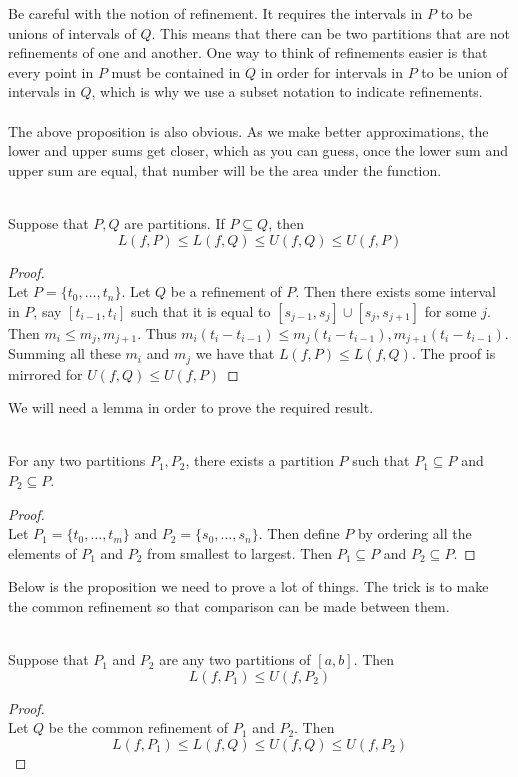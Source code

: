 \documentclass[a4paper]{article}
\begin{document}
Be careful with the notion of refinement. It requires the intervals in $P$ to be unions of intervals of $Q$. This means that there can be two partitions that are not refinements of one and another. One way to think of refinements easier is that every point in $P$ must be contained in $Q$ in order for intervals in $P$ to be union of intervals in $Q$, which is why we use a subset notation to indicate refinements. \\~\\
The above proposition is also obvious. As we make better approximations, the lower and upper sums get closer, which as you can guess, once the lower sum and upper sum are equal, that number will be the area under the function. 

\begin{prp}{}{}\\ Suppose that $P,Q$ are partitions. If $P\subseteq Q$, then $$L(f,P)\leq L(f,Q)\leq U(f,Q)\leq U(f,P)$$ 
\begin{proof}\\ Let $P=\{t_0,\dots,t_n\}$. Let $Q$ be a refinement of $P$. Then there exists some interval in $P$, say $[t_{i-1},t_i]$ such that it is equal to $[s_{j-1},s_j]\cup[s_j,s_{j+1}]$ for some $j$. Then $m_i\leq m_j,m_{j+1}$. Thus $m_i(t_i-t_{i-1})\leq m_j(t_i-t_{i-1}),m_{j+1}(t_i-t_{i-1})$. Summing all these $m_i$ and $m_j$ we have that $L(f,P)\leq L(f,Q)$. The proof is mirrored for $U(f,Q)\leq U(f,P)$
\end{proof}
\end{prp}

We will need a lemma in order to prove the required result. 

\begin{lmm}{}{}\\ For any two partitions $P_1,P_2$, there exists a partition $P$ such that $P_1\subseteq P$ and $P_2\subseteq P$. 
\begin{proof}\\ Let $P_1=\{t_0,\dots,t_m\}$ and $P_2=\{s_0,\dots,s_n\}$. Then define $P$ by ordering all the elements of $P_1$ and $P_2$ from smallest to largest. Then $P_1\subseteq P$ and $P_2\subseteq P$. 
\end{proof}
\end{lmm}

Below is the proposition we need to prove a lot of things. The trick is to make the common refinement so that comparison can be made between them. 

\begin{prp}{}{}\\ Suppose that $P_1$ and $P_2$ are any two partitions of $[a,b]$. Then $$L(f,P_1)\leq U(f,P_2)$$ 
\begin{proof}\\ Let $Q$ be the common refinement of $P_1$ and $P_2$. Then $$L(f,P_1)\leq L(f,Q)\leq U(f,Q)\leq U(f,P_2)$$
\end{proof}
\end{prp}
\end{document}
